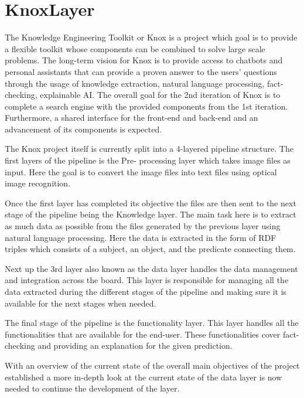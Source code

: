 \section{KnoxLayer}
The Knowledge Engineering Toolkit or Knox is a project which goal is to provide a flexible toolkit whose components can be combined 
to solve large scale problems. The long-term vision for Knox is to provide access to chatbots and personal assistants that can  
provide a proven answer to the users' questions through the usage of knowledge extraction, natural language processing, fact- 
checking, explainable AI.
The overall goal for the 2nd iteration of Knox is to complete a search engine with the provided components from the 1st iteration. 
Furthermore, a shared interface for the front-end and back-end and an advancement of its components is expected. 


The Knox project itself is currently split into a 4-layered pipeline structure. The first layers of the pipeline is the Pre-
processing layer which takes image files as input. Here the goal is to convert the image files into text files using optical image 
recognition. 


Once the first layer has completed its objective the files are then sent to the next stage of the pipeline being the Knowledge 
layer. The main task here is to extract as much data as possible from the files generated by the previous layer using natural 
language processing. Here the data is extracted in the form of RDF triples which consists of a subject, an object, and the predicate 
connecting them. 


Next up the 3rd layer also known as the data layer handles the data management and integration across the board. This layer is 
responsible for managing all the data extracted during the different stages of the pipeline and making sure it is available for the 
next stages when needed. 


The final stage of the pipeline is the functionality layer. This layer handles all the functionalities that are available for the 
end-user. These functionalities cover fact-checking and providing an explanation for the given prediction.


With an overview of the current state of the overall main objectives of the project  established a more in-depth look at the current 
state of the data layer is now needed to continue the development of the layer. 

